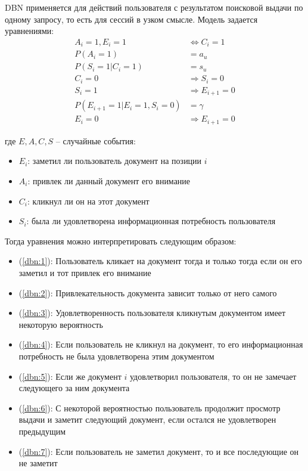 \documentclass[diploma]{nanolab2015}
\begin{document}
DBN применяется для действий пользователя с результатом поисковой выдачи по одному запросу, то есть для сессий в узком смысле. Модель задается уравнениями:
\begin{align}
    A_i = 1, E_i = 1                  & \Leftrightarrow C_i = 1 \label{dbn:1} \\
    P(A_i = 1)                        & = a_u                  \label{dbn:2}  \\
    P(S_i = 1| C_i = 1)               & = s_u                   \label{dbn:3} \\
    C_i = 0                           & \Rightarrow S_i = 0 \label{dbn:4}     \\
    S_i = 1                           & \Rightarrow E_{i+1} = 0 \label{dbn:5} \\
    P(E_{i+1} = 1 | E_i = 1, S_i = 0) & = \gamma                \label{dbn:6} \\
    E_i = 0                           & \Rightarrow E_{i+1} = 0 \label{dbn:7}
\end{align}


где $E, A, C, S$ -- случайные события:
\begin{itemize}
    \item $E_i$: заметил ли пользователь документ на позиции $i$
    \item $A_i$: привлек ли данный документ его внимание
    \item $C_i$: кликнул ли он на этот документ
    \item $S_i$: была ли удовлетворена информационная потребность пользователя
\end{itemize}
Тогда уравнения можно интерпретировать следующим образом:
\begin{itemize}
    \item (\ref{dbn:1}): Пользователь кликает на документ тогда и только тогда если он его заметил и тот привлек его внимание
    \item (\ref{dbn:2}): Привлекательность документа зависит только от него самого
    \item (\ref{dbn:3}): Удовлетворенность пользователя кликнутым документом имеет некоторую вероятность
    \item (\ref{dbn:4}): Если пользователь не кликнул на документ, то его информационная потребность не была удовлетворена этим документом
    \item (\ref{dbn:5}): Если же документ $i$ удовлетворил пользователя, то он не замечает следующего за ним документа
    \item (\ref{dbn:6}): С некоторой вероятностью пользователь продолжит просмотр выдачи и заметит следующий документ, если остался не удовлетворен предыдущим
    \item (\ref{dbn:7}): Если пользователь не заметил документ, то и все последующие он не заметит
\end{itemize}
\end{document}
